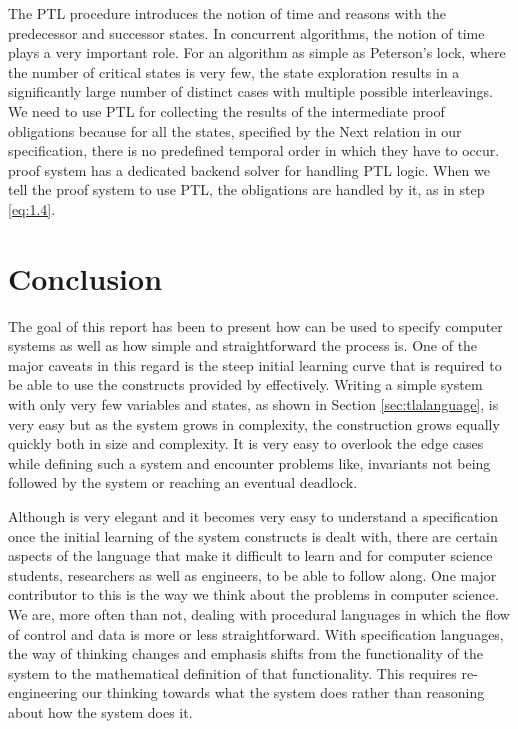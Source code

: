 \documentclass[fleqn]{tukseminar}
\begin{document}
		The PTL procedure introduces the notion of time and reasons with the predecessor and successor states. In concurrent algorithms, the notion of time plays a very important role. For an algorithm as simple as Peterson's lock, where the number of critical states is very few, the state exploration results in a significantly large number of distinct cases with multiple possible interleavings. We need to use PTL for collecting the results of the intermediate proof obligations because for all the states, specified by the Next relation in our specification, there is no predefined temporal order in which they have to occur. \tla proof system has a dedicated backend solver for handling PTL logic. When we tell the proof system to use PTL, the obligations are handled by it, as in step \ref{eq:1.4}. 
		\newpage
		
		\section{Conclusion}
		
		The goal of this report has been to present how \tla can be used to specify computer systems as well as how simple and straightforward the process is. One of the major caveats in this regard is the steep initial learning curve that is required to be able to use the constructs provided by \tla effectively. Writing a simple system with only very few variables and states, as shown in Section \ref{sec:tlalanguage}, is very easy but as the system grows in complexity, the construction grows equally quickly both in size and complexity. It is very easy to overlook the edge cases while defining such a system and encounter problems like, invariants not being followed by the system or reaching an eventual deadlock.
		
		Although \tla is very elegant and it becomes very easy to understand a specification once the initial learning of the system constructs is dealt with, there are certain aspects of the language that make it difficult to learn and for computer science students, researchers as well as engineers, to be able to follow along. One major contributor to this is the way we think about the problems in computer science. We are, more often than not, dealing with procedural languages in which the flow of control and data is more or less straightforward. With specification languages, the way of thinking changes and emphasis shifts from the functionality of the system to the mathematical definition of that functionality. This requires re-engineering our thinking towards what the system does rather than reasoning about how the system does it.
		
\end{document}
